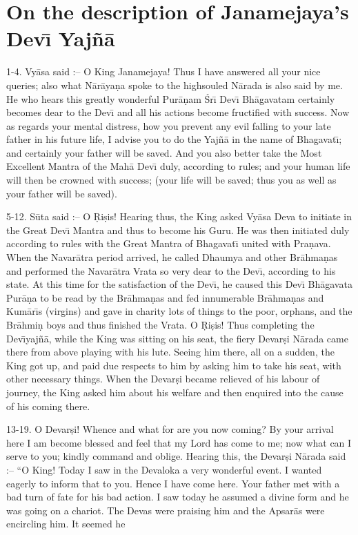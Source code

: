 \chapter{On the description of Janamejaya's Dev\={\i} Yaj\~n\=a}

1-4. Vy\=asa said :-- O King Janamejaya! Thus I have answered all your nice queries; also what N\=ar\=aya\d{n}a spoke to the highsouled N\=arada is also said by me. He who hears this greatly wonderful Pur\=a\d{n}am \'Sr\={\i} Dev\={\i} Bh\=agavatam certainly becomes dear to the Dev\={\i} and all his actions become fructified with success. Now as regards your mental distress, how you prevent any evil falling to your late father in his future life, I advise you to do the Yaj\~n\=a in the name of Bhagavat\={\i}; and certainly your father will be saved. And you also better take the Most Excellent Mantra of the Mah\=a Dev\={\i} duly, according to rules; and your human life will then be crowned with success; (your life will be saved; thus you as well as your father will be saved).

5-12. S\=uta said :-- O \d{R}i\d{s}is! Hearing thus, the King asked Vy\=asa Deva to initiate in the Great Dev\={\i} Mantra and thus to become his Guru. He was then initiated duly according to rules with the Great Mantra of Bhagavat\={\i} united with Pra\d{n}ava. When the Navar\=atra period arrived, he called Dhaumya and other Br\=ahma\d{n}as and performed the Navar\=atra Vrata so very dear to the Dev\={\i}, according to his state. At this time for the satisfaction of the Dev\={\i}, he caused this Dev\={\i} Bh\=agavata Pur\=a\d{n}a to be read by the Br\=ahma\d{n}as and fed innumerable Br\=ahma\d{n}as and Kum\=ar\={\i}s (virgins) and gave in charity lots of things to the poor, orphans, and the Br\=ahmi\d{n} boys and thus finished the Vrata. O \d{R}i\d{s}is! Thus completing the Dev\={\i}yaj\~n\=a, while the King was sitting on his seat, the fiery Devar\d{s}i N\=arada came there from above playing with his lute. Seeing him there, all on a sudden, the King got up, and paid due respects to him by asking him to take his seat, with other necessary things. When the Devar\d{s}i became relieved of his labour of journey, the King asked him about his welfare and then enquired into the cause of his coming there.

13-19. O Devar\d{s}i! Whence and what for are you now coming? By your arrival here I am become blessed and feel that my Lord has come to me; now what can I serve to you; kindly command and oblige. Hearing this, the Devar\d{s}i N\=arada said :-- ``O King! Today I saw in the Devaloka a very wonderful event. I wanted eagerly to inform that to you. Hence I have come here. Your father met with a bad turn of fate for his bad action. I saw today he assumed a divine form and he was going on a chariot. The Devas were praising him and the Apsar\=as were encircling him. It seemed he

